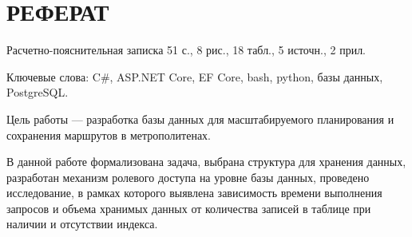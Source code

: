 \chapter*{РЕФЕРАТ}

Расчетно-пояснительная записка 51 с., 8 рис., 18 табл., 5 источн., 2 прил.

Ключевые слова: C\#, ASP.NET Core, EF Core, bash, python, базы данных, PostgreSQL.

Цель работы --- разработка базы данных для масштабируемого планирования и сохранения маршрутов в метрополитенах.

В данной работе формализована задача, выбрана структура для хранения данных, разработан механизм ролевого доступа на уровне базы данных, проведено исследование, в рамках которого выявлена зависимость времени выполнения запросов и объема хранимых данных от количества записей в таблице при наличии и отсутствии индекса.
